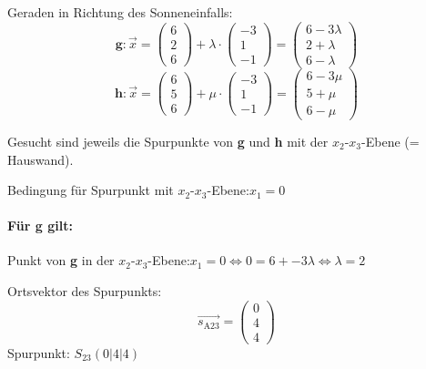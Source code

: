 \documentclass{ajc}
\numberwithin{equation}{subsection}
\begin{document}
	Geraden in Richtung des Sonneneinfalls:
	\begin{equation}
		\mathbf{g}: \overrightarrow{x}=\left(\begin{array}{r} 6 \\ 2 \\ 6\end{array}\right) + \lambda \cdot \left(\begin{array}{r} -3 \\ 1 \\ -1\end{array}\right) = \left(\begin{array}{r} 6 - 3 \lambda \\ 2 + \lambda \\ 6 - \lambda\end{array}\right)
	\end{equation}
	\begin{equation}
		\mathbf{h}: \overrightarrow{x}=\left(\begin{array}{r} 6 \\ 5 \\ 6\end{array}\right) + \mu \cdot \left(\begin{array}{r} -3 \\ 1 \\ -1\end{array}\right) = \left(\begin{array}{r} 6 - 3 \mu \\ 5 + \mu \\ 6 - \mu\end{array}\right)
	\end{equation}
	
	Gesucht sind jeweils die Spurpunkte von \textbf{g} und \textbf{h} mit der $x_2\text{-}x_3$-Ebene (= Hauswand).
	
	Bedingung für Spurpunkt mit $x_2$-$x_3$-Ebene:\quad $x_1 = 0$
	
	\paragraph{Für g gilt:} 
	
	Punkt von \textbf{g} in der $x_2\text{-}x_3$-Ebene:\quad $x_1 = 0 \Leftrightarrow 0 = 6 + -3 \lambda \Leftrightarrow \lambda = 2$
	
	Ortsvektor des Spurpunkts: 
	\begin{equation}
		\overrightarrow{s_\text{A23}}=\left(\begin{array}{r} 0 \\ 4 \\ 4\end{array}\right)
	\end{equation}
	Spurpunkt: $S_\text{23}(0|4|4)$
	
\end{document}

